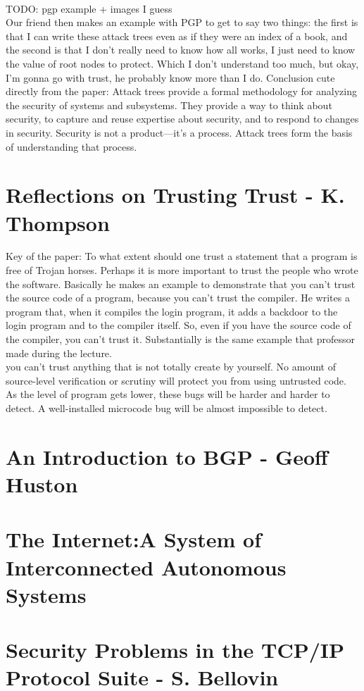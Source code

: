 \\
TODO: pgp example + images I guess
\\
Our friend then makes an example with PGP to get to say two things: the first is that I can write these attack trees even as if they were an index of a book, and the second is that I don’t really need to know how all works, I just need to know the value of root nodes to protect. Which I don’t understand too much, but okay, I’m gonna go with trust, he probably know more than I do.
Conclusion cute directly from the paper:  
Attack trees provide a formal methodology for analyzing the security of systems and subsystems.
They provide a way to think about security, to capture and reuse expertise about security, and to
respond to changes in security. Security is not a product—it’s a process. Attack trees form the basis
of understanding that process.
\section{Reflections on Trusting Trust - K. Thompson}\label{section:Trust}
Key of the paper: To what extent should one trust a statement that a program is free of Trojan horses. Perhaps it is more important to trust the people who wrote the software.
Basically he makes an example to demonstrate that you can't trust the source code of a program, because you can't trust the compiler. He writes a program that, when it compiles the login program, it adds a backdoor to the login program and to the compiler itself. So, even if you have the source code of the compiler, you can't trust it. Substantially is the same example that professor made during the lecture.
\\you can't trust anything that is not totally create by yourself. No amount of source-level verification or scrutiny will protect you from using untrusted code. As the level of program gets lower, these bugs will be harder and harder to detect. A well-installed microcode bug will be almost impossible to detect.
\section{An Introduction to BGP - Geoff Huston}\label{section:BGP}
\section{The Internet:A System of Interconnected Autonomous Systems}\label{section:Internet}
\section{Security Problems in the TCP/IP Protocol Suite - S. Bellovin}\label{section:SecurityTCP}
